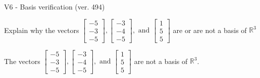 \begin{exercise}
  \begin{exerciseTitle}V6 - Basis verification (ver. 494)\end{exerciseTitle}
  \begin{exerciseStatement}
    Explain why the vectors \(\left[\begin{array}{r}
-5 \\
-3 \\
-5
\end{array}\right] , \left[\begin{array}{r}
-3 \\
-4 \\
-5
\end{array}\right] , \text{ and } \left[\begin{array}{r}
1 \\
5 \\
5
\end{array}\right]\) are or are not a basis of \(\mathbb{R}^3\)	


  \end{exerciseStatement}
  \begin{exerciseAnswer}
   The vectors \(\left[\begin{array}{r}
-5 \\
-3 \\
-5
\end{array}\right] , \left[\begin{array}{r}
-3 \\
-4 \\
-5
\end{array}\right] , \text{ and } \left[\begin{array}{r}
1 \\
5 \\
5
\end{array}\right]\) 
  	 are not  a basis of \(\mathbb{R}^3\).
  


  \end{exerciseAnswer}
\end{exercise}